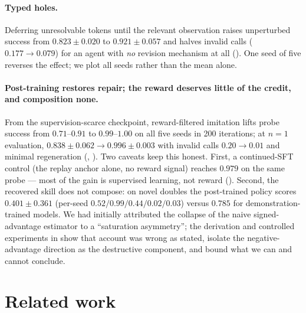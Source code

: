 \documentclass{article}
\begin{document}
\paragraph{Typed holes.} Deferring unresolvable tokens until the relevant observation raises
unperturbed success from $0.823\pm0.020$ to $0.921\pm0.057$ and halves invalid calls
($0.177 \to 0.079$) for an agent with \emph{no} revision mechanism at all (). One
seed of five reverses the effect; we plot all seeds rather than the mean alone.

\paragraph{Post-training restores repair; the reward deserves little of the credit, and
composition none.} From the supervision-scarce checkpoint, reward-filtered imitation lifts probe
success from $0.71$--$0.91$ to $0.99$--$1.00$ on all five seeds in 200 iterations; at $n{=}1$
evaluation, $0.838\pm0.062 \to 0.996\pm0.003$ with invalid calls $0.20 \to 0.01$ and minimal
regeneration (, ). Two caveats keep this honest. First, a continued-SFT
control (the replay anchor alone, no reward signal) reaches $0.979$ on the same probe --- most of the
gain is supervised learning, not reward (). Second, the recovered skill does not
compose: on novel doubles the post-trained policy scores $0.401\pm0.361$ (per-seed
$0.52/0.99/0.44/0.02/0.03$) versus $0.785$ for demonstration-trained models. We had initially
attributed the collapse of the naive signed-advantage estimator to a ``saturation asymmetry''; the
derivation and controlled experiments in  show that account was wrong as stated, isolate
the negative-advantage direction as the destructive component, and bound what we can and cannot
conclude.

\section{Related work}
\end{document}
